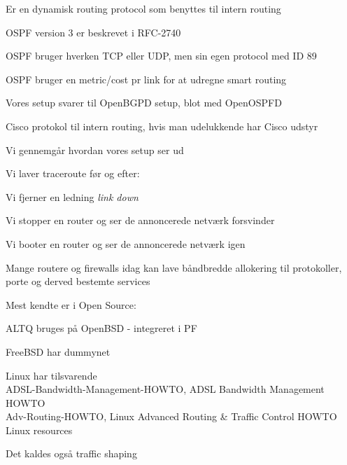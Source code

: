 \documentclass[Screen16to9,17pt,footrule]{foils}
\begin{document}
\begin{list1}
\item Er en dynamisk routing protocol som benyttes til intern routing
\item OSPF version 3 er beskrevet i RFC-2740
\item OSPF bruger hverken TCP eller UDP, men sin egen protocol med ID 89
\item OSPF bruger en metric/cost pr link for at udregne smart routing
\item {}
\item Vores setup svarer til OpenBGPD setup, blot med OpenOSPFD
\end{list1}



\begin{list1}
\item Cisco protokol til intern routing, hvis man udelukkende har Cisco udstyr
\item {}
\end{list1}


\begin{list1}
\item Vi gennemgår hvordan vores setup ser ud
\item Vi laver traceroute før og efter:
\item Vi fjerner en ledning \emph{link down}
\item Vi stopper en router og ser de annoncerede netværk forsvinder
\item Vi booter en router og ser de annoncerede netværk igen
\end{list1}


\begin{list1}
\item Mange routere og firewalls idag kan lave båndbredde allokering til
  protokoller, porte og derved bestemte services
\item Mest kendte er i Open Source:
\begin{list2}
\item ALTQ bruges på OpenBSD - integreret i PF
\item FreeBSD har dummynet
\item Linux har tilsvarende\\
ADSL-Bandwidth-Management-HOWTO, ADSL Bandwidth Management HOWTO\\
Adv-Routing-HOWTO, Linux Advanced Routing \& Traffic Control HOWTO\\
 Linux resources
\end{list2}
\item Det kaldes også traffic shaping
\end{list1}
\end{document}
